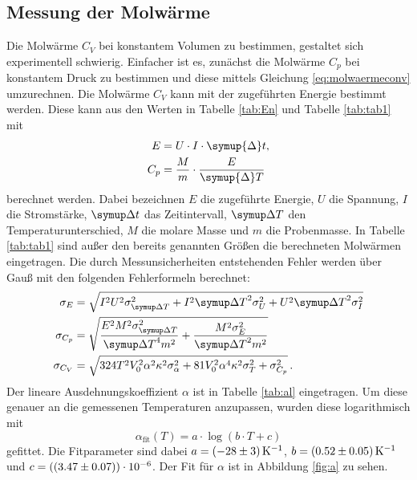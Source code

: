 \subsection{Messung der Molwärme}
Die Molwärme $C_V$ bei konstantem Volumen zu bestimmen, gestaltet sich experimentell schwierig. Einfacher ist es, zunächst die Molwärme $C_p$ bei konstantem Druck zu bestimmen und diese mittels Gleichung \eqref{eq:molwaermeconv}
umzurechnen. 
Die Molwärme $C_V$ kann mit der zugeführten Energie bestimmt werden. Diese kann aus den Werten in Tabelle \ref{tab:En} und Tabelle \ref{tab:tab1} mit
\begin{align}
	E &= U \cdot I \cdot \symup{\Delta} t,\\
	C_p &= \frac{M}{m}\cdot\frac{E}{\symup{\Delta} T}
	\label{eqn:cp}
\end{align}
berechnet werden. Dabei bezeichnen $E$ die zugeführte Energie, $U$ die Spannung, $I$ die Stromstärke, $\symup\Delta t$ das Zeitintervall, $\symup\Delta T$ den Temperaturunterschied, $M$ die molare Masse und $m$ die Probenmasse. In Tabelle \ref{tab:tab1} sind außer den bereits genannten Größen die berechneten Molwärmen eingetragen.
Die durch Messunsicherheiten entstehenden Fehler werden über Gauß mit den folgenden Fehlerformeln berechnet:
\begin{align*}
	\sigma_E &= \sqrt{I^{2} U^{2} \sigma_{{\symup\Delta T}}^{2} + I^{2} {\symup\Delta T}^{2} \sigma_{U}^{2} + U^{2} {\symup\Delta T}^{2} \sigma_{I}^{2}}\\
	\sigma_{C_p} &= \sqrt{\frac{E^{2} M^{2} \sigma_{{\symup\Delta T}}^{2}}{{\symup\Delta T}^{4} m^{2}} +\frac{M^{2} \sigma_{E}^{2}}{{\symup\Delta T}^{2} m^{2}}}\\
	\sigma_{C_V} &= \sqrt{324 T^{2} V_{0}^{2} \alpha^{2} \kappa^{2} \sigma_{\alpha}^{2} + 81 V_{0}^{2} \alpha^{4} \kappa^{2} \sigma_{T}^{2} + \sigma_{C_{p}}^{2}}\,\text.
\end{align*}
Der lineare Ausdehnungskoeffizient $\alpha$ ist in Tabelle \ref{tab:al} eingetragen. Um diese genauer an die gemessenen Temperaturen anzupassen, wurden diese logarithmisch mit
\begin{equation*}
	\alpha_\text{fit}(T) = a\cdot\log{(b\cdot T + c)}
\end{equation*}
gefittet. Die Fitparameter sind dabei $a = \SI{-28 \pm 3}{\per\kelvin}$, $b = \SI{0.52\pm0.05}{\per\kelvin}$ und $c = (\SI{3.47\pm0.07}{})\cdot 10^{-6}$.
Der Fit für $\alpha$ ist in Abbildung \ref{fig:a} zu sehen.

